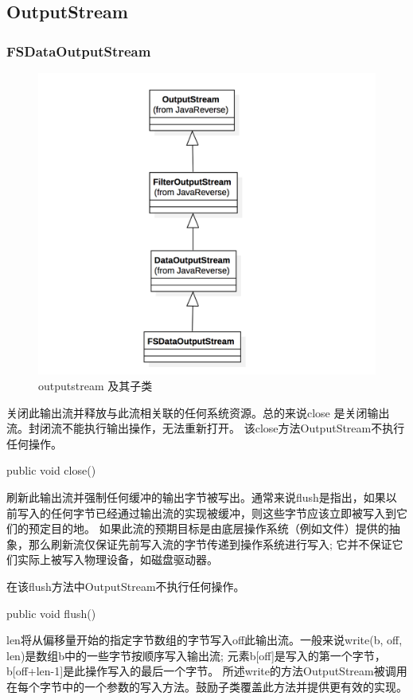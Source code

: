 \subsection{OutputStream}
\subsubsection{FSDataOutputStream}
\begin{figure}
\centering
\includegraphics[width =1\linewidth]{UML/outputstream/11.png}
\caption{outputstream 及其子类}
\label{fig:OutputStream}
\end{figure}



关闭此输出流并释放与此流相关联的任何系统资源。总的来说close 是关闭输出流。封闭流不能执行输出操作，无法重新打开。
该close方法OutputStream不执行任何操作。
\begin{java}
public void close()
\end{java}
刷新此输出流并强制任何缓冲的输出字节被写出。通常来说flush是指出，如果以前写入的任何字节已经通过输出流的实现被缓冲，则这些字节应该立即被写入到它们的预定目的地。
如果此流的预期目标是由底层操作系统（例如文件）提供的抽象，那么刷新流仅保证先前写入流的字节传递到操作系统进行写入; 它并不保证它们实际上被写入物理设备，如磁盘驱动器。

在该flush方法中OutputStream不执行任何操作。
\begin{java}
public void flush()
\end{java}
len将从偏移量开始的指定字节数组的字节写入off此输出流。一般来说write(b, off, len)是数组b中的一些字节按顺序写入输出流; 元素b[off]是写入的第一个字节，b[off+len-1]是此操作写入的最后一个字节。
所述write的方法OutputStream被调用在每个字节中的一个参数的写入方法。鼓励子类覆盖此方法并提供更有效的实现。

